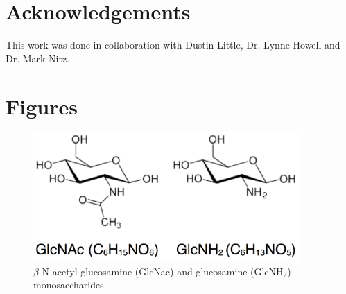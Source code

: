 
\section{Acknowledgements}
This work was done in collaboration with Dustin Little, Dr. Lynne Howell and Dr. Mark Nitz.

\section{Figures}

\begin{figure}[htbp]
\centering
\includegraphics[width=4in]{figures/results4/sugar_structures.pdf}
\caption[NAG]{$\beta$-N-acetyl-glucosamine (GlcNac) and glucosamine (GlcNH$_2$) monosaccharides.}
\label{fig:nag}
\end{figure}

